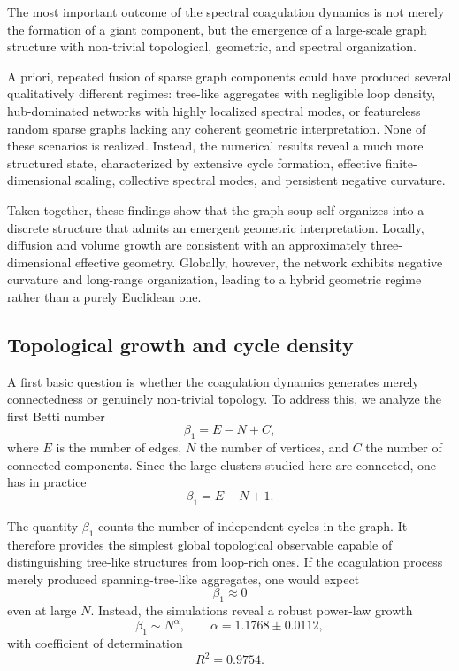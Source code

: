 \documentclass[11pt]{article}
\begin{document}
The most important outcome of the spectral coagulation dynamics is not merely the formation of a giant component, but the emergence of a large-scale graph structure with non-trivial topological, geometric, and spectral organization.

A priori, repeated fusion of sparse graph components could have produced several qualitatively different regimes: tree-like aggregates with negligible loop density, hub-dominated networks with highly localized spectral modes, or featureless random sparse graphs lacking any coherent geometric interpretation. None of these scenarios is realized. Instead, the numerical results reveal a much more structured state, characterized by extensive cycle formation, effective finite-dimensional scaling, collective spectral modes, and persistent negative curvature.

Taken together, these findings show that the graph soup self-organizes into a discrete structure that admits an emergent geometric interpretation. Locally, diffusion and volume growth are consistent with an approximately three-dimensional effective geometry. Globally, however, the network exhibits negative curvature and long-range organization, leading to a hybrid geometric regime rather than a purely Euclidean one.

\subsection{Topological growth and cycle density}
\label{sec:topology}

A first basic question is whether the coagulation dynamics generates merely connectedness or genuinely non-trivial topology.
To address this, we analyze the first Betti number
\[
\beta_1 = E - N + C,
\]
where $E$ is the number of edges, $N$ the number of vertices, and $C$ the number of connected components.
Since the large clusters studied here are connected, one has in practice
\[
\beta_1 = E - N + 1.
\]

The quantity $\beta_1$ counts the number of independent cycles in the graph.
It therefore provides the simplest global topological observable capable of distinguishing tree-like structures from loop-rich ones.
If the coagulation process merely produced spanning-tree-like aggregates, one would expect
\[
\beta_1 \approx 0
\]
even at large $N$.
Instead, the simulations reveal a robust power-law growth
\[
\beta_1 \sim N^\alpha,
\qquad
\alpha = 1.1768 \pm 0.0112,
\]
with coefficient of determination
\[
R^2 = 0.9754.
\]
\end{document}
